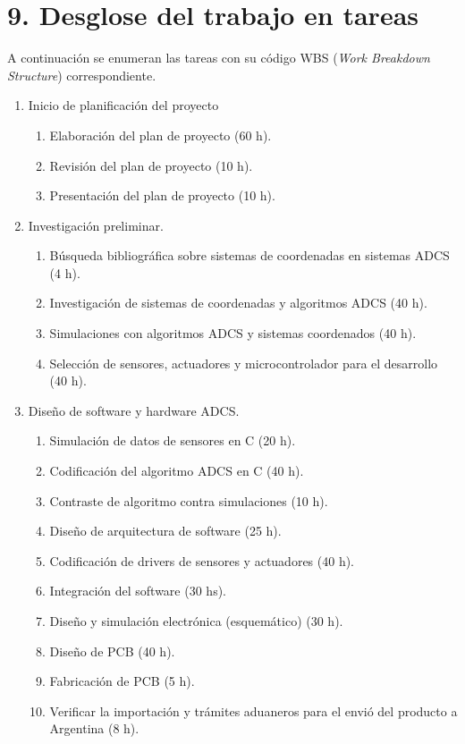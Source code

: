 \documentclass[
11pt, %
]{charter}
\begin{document}
\section{9. Desglose del trabajo en tareas}
\label{sec:wbs}
	A continuación se enumeran las tareas con su código WBS (\textit{Work Breakdown Structure}) correspondiente.  
\begin{enumerate}
	\item Inicio de planificación del proyecto
	\begin{enumerate}
		\item Elaboración del plan de proyecto (60 h). 
		\item Revisión del plan de proyecto (10 h).
		\item Presentación del plan de proyecto (10 h).
	\end{enumerate}
	\item Investigación preliminar.
		\begin{enumerate}
			\item Búsqueda bibliográfica sobre sistemas de coordenadas en sistemas ADCS (4 h). 
			\item Investigación de sistemas de coordenadas y algoritmos ADCS (40 h).
			\item Simulaciones con algoritmos ADCS y sistemas coordenados (40 h).   
			\item Selección de sensores, actuadores y microcontrolador para el desarrollo (40 h).					
		\end{enumerate}
	\item Diseño de software y hardware ADCS. 
		\begin{enumerate}
			\item Simulación de datos de sensores en C (20 h).
			\item Codificación del algoritmo ADCS en C (40 h). 
			\item Contraste de algoritmo contra simulaciones (10 h). 
			\item Diseño de arquitectura de software (25 h). 
			\item Codificación de drivers de sensores y actuadores (40 h). 
			\item Integración del software (30 hs). 
			\item Diseño y simulación electrónica (esquemático)  (30 h). 
			\item Diseño de PCB  (40 h). 
			\item Fabricación de PCB  (5 h). 
			\item Verificar la importación y trámites aduaneros para el envió del producto a Argentina (8 h). 

\end{enumerate}
\end{enumerate}
\end{document}
